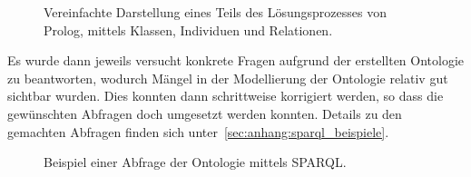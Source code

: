 \begin{figure}[H]
\centering {}
\caption{Vereinfachte Darstellung eines Teils des Lösungsprozesses von Prolog, mittels Klassen, Individuen und Relationen.\label{fig:prolog_loesungsprozess}\protect\footnotemark}
\end{figure}

Es wurde dann jeweils versucht konkrete Fragen aufgrund der erstellten Ontologie zu beantworten, wodurch Mängel in der Modellierung der Ontologie relativ gut sichtbar wurden. Dies konnten dann schrittweise korrigiert werden, so dass die gewünschten Abfragen doch umgesetzt werden konnten. Details zu den gemachten Abfragen finden sich unter~\autoref{sec:anhang:sparql_beispiele}.

\begin{figure}[H]
\centering {}
\caption{Beispiel einer Abfrage der Ontologie mittels SPARQL.\label{fig:sparql_beispiel}\protect\footnotemark}
\end{figure}

